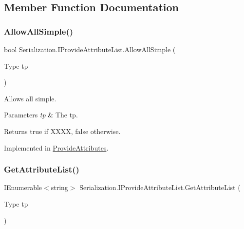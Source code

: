 \subsection{Member Function Documentation}
\mbox{\label{interface_serialization_1_1_i_provide_attribute_list_a67a8c176842f57fb928e68e87fdc4ade}} 
\subsubsection{\texorpdfstring{Allow\+All\+Simple()}{AllowAllSimple()}}
{\footnotesize\ttfamily bool Serialization.\+I\+Provide\+Attribute\+List.\+Allow\+All\+Simple (\begin{DoxyParamCaption}\item[{Type}]{tp }\end{DoxyParamCaption})}



Allows all simple. 


\begin{DoxyParams}{Parameters}
{\em tp} & The tp.\\
\hline
\end{DoxyParams}
\begin{DoxyReturn}{Returns}
{\ttfamily true} if X\+X\+XX, {\ttfamily false} otherwise.
\end{DoxyReturn}


Implemented in \hyperlink{class_provide_attributes_a9b4c8e178f74bc4fc69ed9b2747f173d}{Provide\+Attributes}.

\mbox{\label{interface_serialization_1_1_i_provide_attribute_list_afd95d460c41d4fddfb45b9e342557d01}} 
\subsubsection{\texorpdfstring{Get\+Attribute\+List()}{GetAttributeList()}}
{\footnotesize\ttfamily I\+Enumerable$<$string$>$ Serialization.\+I\+Provide\+Attribute\+List.\+Get\+Attribute\+List (\begin{DoxyParamCaption}\item[{Type}]{tp }\end{DoxyParamCaption})}




